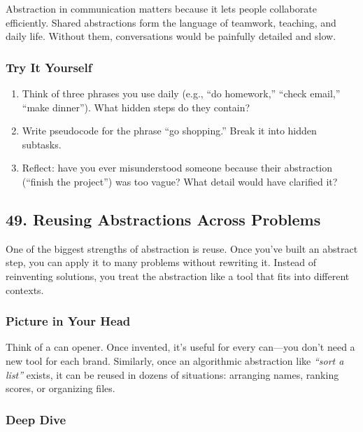 \documentclass[
  letterpaper,
  DIV=11,
  numbers=noendperiod]{scrreprt}
\providecommand{\tightlist}{%
  \setlength{\itemsep}{0pt}\setlength{\parskip}{0pt}}
\begin{document}
Abstraction in communication matters because it lets people collaborate
efficiently. Shared abstractions form the language of teamwork,
teaching, and daily life. Without them, conversations would be painfully
detailed and slow.

\subsubsection{Try It Yourself}\label{try-it-yourself-47}

\begin{enumerate}
\def\labelenumi{\arabic{enumi}.}
\tightlist
\item
  Think of three phrases you use daily (e.g., ``do homework,'' ``check
  email,'' ``make dinner''). What hidden steps do they contain?
\item
  Write pseudocode for the phrase ``go shopping.'' Break it into hidden
  subtasks.
\item
  Reflect: have you ever misunderstood someone because their abstraction
  (``finish the project'') was too vague? What detail would have
  clarified it?
\end{enumerate}

\subsection{49. Reusing Abstractions Across
Problems}\label{reusing-abstractions-across-problems}

One of the biggest strengths of abstraction is reuse. Once you've built
an abstract step, you can apply it to many problems without rewriting
it. Instead of reinventing solutions, you treat the abstraction like a
tool that fits into different contexts.

\subsubsection{Picture in Your Head}\label{picture-in-your-head-48}

Think of a can opener. Once invented, it's useful for every can---you
don't need a new tool for each brand. Similarly, once an algorithmic
abstraction like \emph{``sort a list''} exists, it can be reused in
dozens of situations: arranging names, ranking scores, or organizing
files.

\subsubsection{Deep Dive}\label{deep-dive-18}
\end{document}

